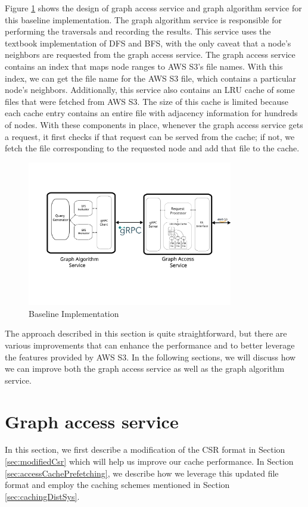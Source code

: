 \medskip
Figure \ref{fig:baselineImpl} shows the design of graph access service and graph
algorithm service for this baseline implementation. The graph algorithm service
is responsible for performing the traversals and recording the results. This
service uses the textbook implementation of DFS and BFS, with the only caveat
that a node's neighbors are requested from the graph access service. The graph
access service contains an index that maps node ranges to AWS S3's file names. With
this index, we can get the file name for the AWS S3 file, which contains a particular
node's neighbors. Additionally, this service also contains an LRU cache of some
files that were fetched from AWS S3. The size of this cache is limited because each
cache entry contains an entire file with adjacency information for
hundreds of nodes. With these components in place, whenever the graph access
service gets a request, it first checks if that request can be served from the
cache; if not, we fetch the file corresponding to the requested node and add
that file to the cache.
\begin{figure}[ht]
    \centering
    \includegraphics[width=0.8\textwidth]{figures/baseline.png}
    \caption{Baseline Implementation}
    \label{fig:baselineImpl}
\end{figure}

\medskip
The approach described in this section is quite straightforward, but there are
various improvements that can enhance the performance and to better 
leverage the features provided by AWS S3. In the following sections, we will
discuss how we can improve both the graph access service
as well as the graph algorithm service. 

\section{Graph access service}\label{sec:graphAccess}
In this section, we first describe a modification of the CSR format in
Section \ref{sec:modifiedCsr} which will help us improve our cache performance.
In Section \ref{sec:accessCachePrefetching}, we describe how we leverage
this updated file format and employ the caching schemes mentioned in
Section \ref{sec:cachingDistSys}.

